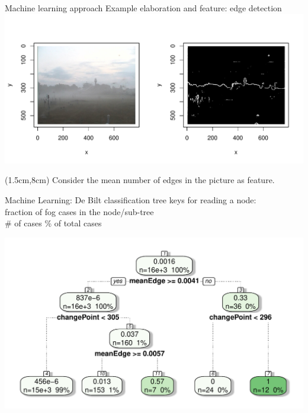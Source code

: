\documentclass[10pt,fleqn]{beamer}\usepackage[]{graphicx}\usepackage[]{color}
\makeatletter
\def\maxwidth{ %
  \ifdim\Gin@nat@width>\linewidth
    \linewidth
  \else
    \Gin@nat@width
  \fi
}
\newenvironment{knitrout}{}{} %
\makeatother
\begin{document}
\begin{frame}{Machine learning approach}
\vspace*{-5mm}
Example elaboration and feature: edge detection
\begin{knitrout}
\color{fgcolor}
\includegraphics[width=\maxwidth]{figure/LandmarkPlotClear-1} 

\end{knitrout}
 \begin{textblock*}{10cm}(1.5cm,8cm)
  Consider the mean number of edges in the picture as feature.
 \end{textblock*}
\end{frame}







\begin{frame}{Machine Learning: De Bilt classification tree} 
\scriptsize{keys for reading a node:\\
 fraction of fog cases in the node/sub-tree\\
 \# of cases  \textemdash \% of total cases}
 

\begin{knitrout}
\color{fgcolor}
\includegraphics[width=\maxwidth]{figure/ClassificationTree-1} 

\end{knitrout}
\end{frame}
\end{document}
